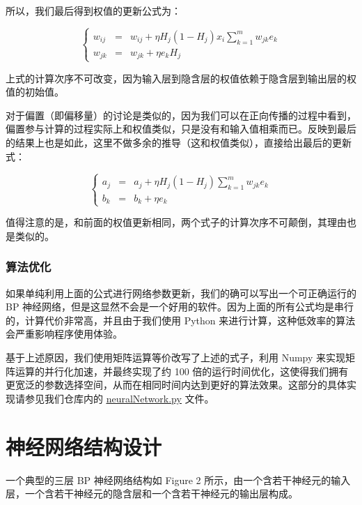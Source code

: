 所以，我们最后得到权值的更新公式为：

$$
\left\{
\begin{aligned}
    w_{ij}&=&w_{ij}+\eta H_j(1-H_j)x_i\sum_{k=1}^mw_{jk}e_k\\
    w_{jk}&=&w_{jk}+\eta e_kH_j
\end{aligned}
\right.
$$

上式的计算次序不可改变，因为输入层到隐含层的权值依赖于隐含层到输出层的权值的初始值。

对于偏置（即偏移量）的讨论是类似的，因为我们可以在正向传播的过程中看到，偏置参与计算的过程实际上和权值类似，只是没有和输入值相乘而已。反映到最后的结果上也是如此，这里不做多余的推导（这和权值类似），直接给出最后的更新式：

$$
\left\{
\begin{aligned}
    a_j&=&a_j+\eta H_j(1-H_j)\sum_{k=1}^mw_{jk}e_k\\
    b_k&=&b_k+\eta e_k
\end{aligned}
\right.
$$

值得注意的是，和前面的权值更新相同，两个式子的计算次序不可颠倒，其理由也是类似的。

\subsubsection{算法优化}

如果单纯利用上面的公式进行网络参数更新，我们的确可以写出一个可正确运行的 BP 神经网络，但是这显然不会是一个好用的软件。因为上面的所有公式均是串行的，计算代价非常高，并且由于我们使用 Python 来进行计算，这种低效率的算法会严重影响程序使用体验。

基于上述原因，我们使用矩阵运算等价改写了上述的式子，利用 Numpy 来实现矩阵运算的并行化加速，并最终实现了约 100 倍的运行时间优化，这使得我们拥有更宽泛的参数选择空间，从而在相同时间内达到更好的算法效果。这部分的具体实现请参见我们仓库内的 \underline{\href{https://github.com/xwy27/ArtificialIntelligenceProjects/blob/master/AI_Web/NumRecognition/model/neuralNetwork.py}{neuralNetwork.py}} 文件。

\newpage
\section{神经网络结构设计}

一个典型的三层 BP 神经网络结构如 Figure 2 所示，由一个含若干神经元的输入层，一个含若干神经元的隐含层和一个含若干神经元的输出层构成。

